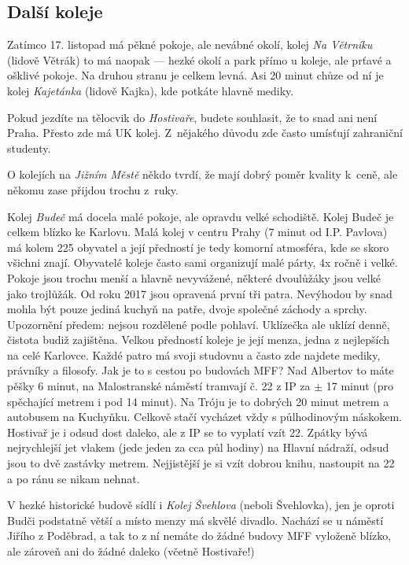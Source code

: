 \subsection{Další koleje}
Zatímco 17. listopad má pěkné pokoje, ale nevábné okolí,
kolej \textit{Na Větrníku} (lidově Větrák) to má naopak ---
hezké okolí a park přímo u koleje, ale prťavé a ošklivé pokoje.
Na druhou stranu je celkem levná.
Asi 20 minut chůze od ní je kolej \textit{Kajetánka} (lidově Kajka),
kde potkáte hlavně mediky.

Pokud jezdíte na tělocvik do \textit{Hostivaře}, budete souhlasit,
že to snad ani není Praha. Přesto zde má UK kolej.
Z~nějakého důvodu zde často umísťují zahraniční studenty.

O kolejích na \textit{Jižním Městě} někdo tvrdí,
že mají dobrý poměr kvality k~ceně, ale někomu zase přijdou trochu z~ruky.

Kolej \textit{Budeč} má docela malé pokoje, ale opravdu velké schodiště.
Kolej Budeč je celkem blízko ke Karlovu.
Malá kolej v centru Prahy (7 minut od I.P. Pavlova) má kolem 225 obyvatel a
její předností je tedy komorní atmosféra, kde se skoro všichni znají.
Obyvatelé koleje často sami organizují malé párty, 4x ročně i velké.
Pokoje jsou trochu menší a hlavně nevyvážené, některé dvoulůžáky jsou
velké jako trojlůžák. Od roku 2017 jsou opravená první tři patra.
Nevýhodou by snad mohla být pouze jediná kuchyň na patře,
dvoje společné záchody a sprchy. Upozornění předem: nejsou
rozdělené podle pohlaví. Uklízečka ale uklízí denně, čistota budiž zajištěna.
Velkou předností koleje je její menza, jedna z nejlepších na celé Karlovce.
Každé patro má svoji studovnu a často zde najdete mediky, právníky a filosofy.
Jak je to s cestou po budovách MFF? Nad Albertov to máte pěšky 6 minut, na
Malostranské náměstí tramvají č. 22 z IP za $\pm$ 17 minut
(pro spěchající metrem i pod 14 minut). Na Tróju je to dobrých 20 minut metrem
a autobusem na Kuchyňku. Celkově stačí vycházet vždy s půlhodinovým náskokem.
Hostivař je i odsud dost daleko, ale z IP se to vyplatí vzít 22.
Zpátky bývá nejrychlejší jet vlakem (jede jeden za cca půl hodiny) na
Hlavní nádraží, odsud jsou to dvě zastávky metrem.
Nejjistější je si vzít dobrou knihu, nastoupit na 22 a po ránu se nikam nehnat.

V hezké historické budově sídlí i \textit{Kolej Švehlova} (neboli Švehlovka),
jen je oproti Budči podstatně větší a místo menzy má skvělé divadlo.
Nachází se u náměstí Jiřího z Poděbrad, a tak to z ní nemáte do žádné budovy
MFF vyloženě blízko, ale zároveň ani do žádné daleko (včetně Hostivaře!)
